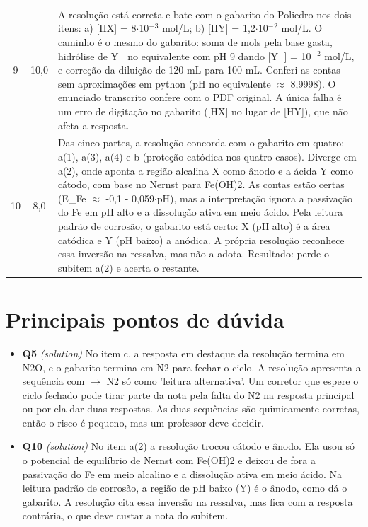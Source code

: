 \documentclass{article}%
\begin{document}
\begin{longtable}{@{}c c p{}@{}}
9 & 10,0 & A resolução está correta e bate com o gabarito do Poliedro nos dois itens: a) {[}HX{]} = 8$\cdot$10$^{-}$$^3$ mol/L; b) {[}HY{]} = 1,2$\cdot$10$^{-}$$^2$ mol/L. O caminho é o mesmo do gabarito: soma de mols pela base gasta, hidrólise de Y$^{-}$ no equivalente com pH 9 dando {[}Y$^{-}${]} = 10$^{-}$$^2$ mol/L, e correção da diluição de 120 mL para 100 mL. Conferi as contas sem aproximações em python (pH no equivalente $\approx$ 8,9998). O enunciado transcrito confere com o PDF original. A única falha é um erro de digitação no gabarito ({[}HX{]} no lugar de {[}HY{]}), que não afeta a resposta. \\
10 & 8,0 & Das cinco partes, a resolução concorda com o gabarito em quatro: a(1), a(3), a(4) e b (proteção catódica nos quatro casos). Diverge em a(2), onde aponta a região alcalina X como ânodo e a ácida Y como cátodo, com base no Nernst para Fe(OH)2. As contas estão certas (E\_Fe $\approx$ -0,1 - 0,059$\cdot$pH), mas a interpretação ignora a passivação do Fe em pH alto e a dissolução ativa em meio ácido. Pela leitura padrão de corrosão, o gabarito está certo: X (pH alto) é a área catódica e Y (pH baixo) a anódica. A própria resolução reconhece essa inversão na ressalva, mas não a adota. Resultado: perde o subitem a(2) e acerta o restante. \\
\bottomrule\end{longtable}%
\section*{Principais pontos de dúvida}%
\begin{itemize}%
\item%
\textbf{Q5} \textit{(solution)} No item c, a resposta em destaque da resolução termina em N2O, e o gabarito termina em N2 para fechar o ciclo. A resolução apresenta a sequência com $\to$ N2 só como 'leitura alternativa'. Um corretor que espere o ciclo fechado pode tirar parte da nota pela falta do N2 na resposta principal ou por ela dar duas respostas. As duas sequências são quimicamente corretas, então o risco é pequeno, mas um professor deve decidir.%
\item%
\textbf{Q10} \textit{(solution)} No item a(2) a resolução trocou cátodo e ânodo. Ela usou só o potencial de equilíbrio de Nernst com Fe(OH)2 e deixou de fora a passivação do Fe em meio alcalino e a dissolução ativa em meio ácido. Na leitura padrão de corrosão, a região de pH baixo (Y) é o ânodo, como dá o gabarito. A resolução cita essa inversão na ressalva, mas fica com a resposta contrária, o que deve custar a nota do subitem.%
\end{itemize}%
\end{document}
